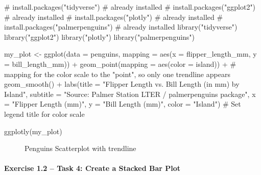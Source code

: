 \documentclass[
  letterpaper,
  DIV=11,
  numbers=noendperiod]{scrartcl}
\let\oldparagraph\paragraph
\renewcommand{\paragraph}[1]{\oldparagraph{#1}\mbox{}}
\newenvironment{Shaded}{\begin{snugshade}}{\end{snugshade}}
\newcommand{\AttributeTok}[1]{\textcolor[rgb]{0.40,0.45,0.13}{#1}}
\newcommand{\CommentTok}[1]{\textcolor[rgb]{0.37,0.37,0.37}{#1}}
\newcommand{\FunctionTok}[1]{\textcolor[rgb]{0.28,0.35,0.67}{#1}}
\newcommand{\NormalTok}[1]{\textcolor[rgb]{0.00,0.23,0.31}{#1}}
\newcommand{\OtherTok}[1]{\textcolor[rgb]{0.00,0.23,0.31}{#1}}
\newcommand{\SpecialCharTok}[1]{\textcolor[rgb]{0.37,0.37,0.37}{#1}}
\newcommand{\StringTok}[1]{\textcolor[rgb]{0.13,0.47,0.30}{#1}}
\begin{document}
\begin{Shaded}
\begin{Highlighting}[]
\CommentTok{\# install.packages("tidyverse") \# already installed}
\CommentTok{\# install.packages("ggplot2") \# already installed}
\CommentTok{\# install.packages("plotly") \# already installed}
\CommentTok{\# install.packages("palmerpenguins") \# already installed}
\FunctionTok{library}\NormalTok{(}\StringTok{"tidyverse"}\NormalTok{)}
\FunctionTok{library}\NormalTok{(}\StringTok{"ggplot2"}\NormalTok{)}
\FunctionTok{library}\NormalTok{(}\StringTok{"plotly"}\NormalTok{)}
\FunctionTok{library}\NormalTok{(}\StringTok{"palmerpenguins"}\NormalTok{)}

\NormalTok{my\_plot }\OtherTok{\textless{}{-}} \FunctionTok{ggplot}\NormalTok{(}\AttributeTok{data =}\NormalTok{ penguins,}
                  \AttributeTok{mapping =} \FunctionTok{aes}\NormalTok{(}\AttributeTok{x =}\NormalTok{ flipper\_length\_mm, }
                                \AttributeTok{y =}\NormalTok{ bill\_length\_mm)) }\SpecialCharTok{+} 
  \FunctionTok{geom\_point}\NormalTok{(}\AttributeTok{mapping =} \FunctionTok{aes}\NormalTok{(}\AttributeTok{color =}\NormalTok{ island)) }\SpecialCharTok{+} \CommentTok{\# mapping for the color scale to the "point", so only one trendline appears}
  \FunctionTok{geom\_smooth}\NormalTok{() }\SpecialCharTok{+}
  \FunctionTok{labs}\NormalTok{(}\AttributeTok{title =} \StringTok{"Flipper Length vs. Bill Length (in mm) by Island"}\NormalTok{,}
       \AttributeTok{subtitle =} \StringTok{"Source: Palmer Station LTER / palmerpenguins package"}\NormalTok{,}
       \AttributeTok{x =} \StringTok{"Flipper Length (mm)"}\NormalTok{, }\AttributeTok{y =} \StringTok{"Bill Length (mm)"}\NormalTok{,}
       \AttributeTok{color =} \StringTok{"Island"}\NormalTok{) }\CommentTok{\# Set legend title for color scale}

\FunctionTok{ggplotly}\NormalTok{(my\_plot)}
\end{Highlighting}
\end{Shaded}

\begin{figure}

{\centering 

}

\caption{\label{fig-penguins-scatterplot-trendline}Penguins Scatterplot
with trendline}

\end{figure}

\hypertarget{exercise-1.2-task-4-create-a-stacked-bar-plot}{%
\paragraph{Exercise 1.2 -- Task 4: Create a Stacked Bar
Plot}\label{exercise-1.2-task-4-create-a-stacked-bar-plot}}
\end{document}
